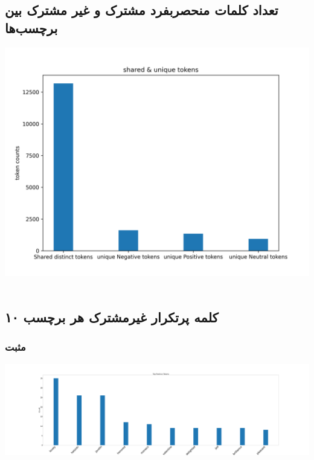 {	\subsection{تعداد کلمات منحصربفرد مشترک و غیر مشترک بین برچسب‌ها}
	{
		\begin{center}
			\includegraphics[scale=0.75]{../stats/shared_&_unique_distinct_tokens_for_each_label.png}
		\end{center}
		\begin{align*}
		\end{align*}
	}
	\newpage
	\subsection{۱۰ کلمه پرتکرار غیرمشترک هر برچسب}
	{ \selectfont
		\subsubsection{\Large مثبت}
		{ \setLR
			\begin{center}
				\includegraphics[scale=0.06]{../stats/top_10_most_repeated_tokens_positive.png}
			\end{center}
			\begin{align*}
			\end{align*}
		}
}}
